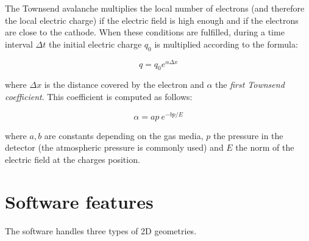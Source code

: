 \documentclass[11pt]{article}
\begin{document}
	The Townsend avalanche multiplies the local number of electrons (and therefore the local electric
	charge) if the electric field is high enough and if the electrons are close
	to the cathode. When these conditions are fulfilled, during a time interval
	$\Delta t$ the initial electric charge $q_0$ is multiplied
	according to the formula:

	\[q = q_0 e^{\alpha \Delta x}\]

	where $\Delta x$ is the distance covered by the electron and $\alpha$ the
	\textit{first Townsend coefficient}. This coefficient is computed as follows:

	\[\alpha = ap \ e^{-bp/E}\]

	where $a, b$ are constants depending on the gas media, $p$ the pressure in
	the detector (the atmospheric pressure is commonly used) and $E$ the norm
	of the electric field at the charges position.

\section{Software features}

	The software handles three types of 2D geometries.
\end{document}
